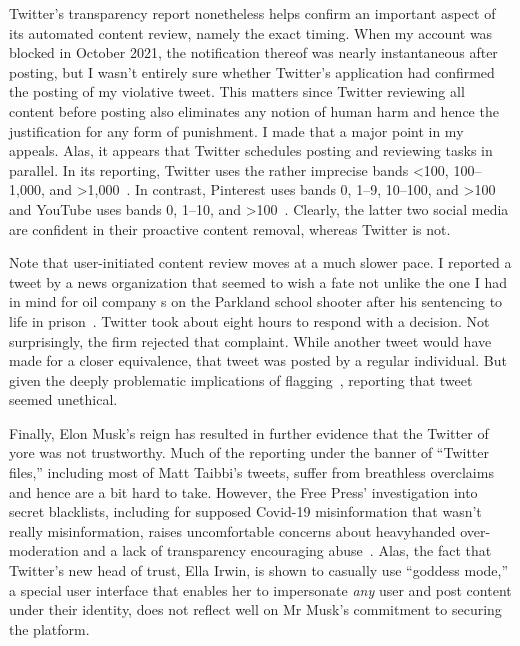Twitter's transparency report nonetheless helps confirm an important aspect of
its automated content review, namely the exact timing. When my account was
blocked in October 2021, the notification thereof was nearly instantaneous after
posting, but I wasn't entirely sure whether Twitter's application had confirmed
the posting of my violative tweet. This matters since Twitter reviewing all
content before posting also eliminates any notion of human harm and hence the
justification for any form of punishment. I made that a major point in my
appeals. Alas, it appears that Twitter schedules posting and reviewing tasks in
parallel. In its reporting, Twitter uses the rather imprecise bands <100,
100--1,000, and >1,000~\cite{Twitter2021}. In contrast, Pinterest uses bands 0,
1--9, 10--100, and >100~\cite{Pinterest2022} and YouTube uses bands 0, 1--10,
and >100~\cite{Google2022}. Clearly, the latter two social media are confident
in their proactive content removal, whereas Twitter is not.

Note that user-initiated content review moves at a much slower pace. I reported
a tweet by a news organization that seemed to wish a fate not unlike the one I
had in mind for oil company s on the Parkland school shooter after his
sentencing to life in prison~\cite{ShapiroDeliso2022}. Twitter took about eight
hours to respond with a decision. Not surprisingly, the firm rejected that
complaint. While another tweet would have made for a closer equivalence, that
tweet was posted by a regular individual. But given the deeply problematic
implications of flagging~\cite{CrawfordGillespie2016}, reporting that tweet
seemed unethical.

Finally, Elon Musk's reign has resulted in further evidence that the Twitter of
yore was not trustworthy. Much of the reporting under the banner of ``Twitter
files,'' including most of Matt Taibbi's tweets, suffer from breathless
overclaims and hence are a bit hard to take. However, the Free Press'
investigation into secret blacklists, including for supposed Covid-19
misinformation that wasn't really misinformation, raises uncomfortable concerns
about heavyhanded over-moderation and a lack of transparency encouraging
abuse~\cite{WeissShrierea2022,Zweig2022}. Alas, the fact that Twitter's new head
of trust, Ella Irwin, is shown to casually use ``goddess mode,'' a special user
interface that enables her to impersonate \emph{any} user and post content under
their identity, does not reflect well on Mr Musk's commitment to securing the
platform.
